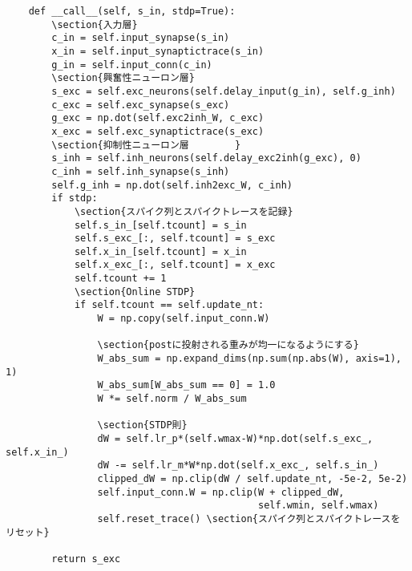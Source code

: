 \begin{verbatim}
    def __call__(self, s_in, stdp=True):
        \section{入力層}
        c_in = self.input_synapse(s_in)
        x_in = self.input_synaptictrace(s_in)
        g_in = self.input_conn(c_in)
        \section{興奮性ニューロン層}
        s_exc = self.exc_neurons(self.delay_input(g_in), self.g_inh)
        c_exc = self.exc_synapse(s_exc)
        g_exc = np.dot(self.exc2inh_W, c_exc)
        x_exc = self.exc_synaptictrace(s_exc)
        \section{抑制性ニューロン層        }
        s_inh = self.inh_neurons(self.delay_exc2inh(g_exc), 0)
        c_inh = self.inh_synapse(s_inh)
        self.g_inh = np.dot(self.inh2exc_W, c_inh)
        if stdp:
            \section{スパイク列とスパイクトレースを記録}
            self.s_in_[self.tcount] = s_in
            self.s_exc_[:, self.tcount] = s_exc
            self.x_in_[self.tcount] = x_in 
            self.x_exc_[:, self.tcount] = x_exc
            self.tcount += 1
            \section{Online STDP}
            if self.tcount == self.update_nt:
                W = np.copy(self.input_conn.W)
                
                \section{postに投射される重みが均一になるようにする}
                W_abs_sum = np.expand_dims(np.sum(np.abs(W), axis=1), 1)
                W_abs_sum[W_abs_sum == 0] = 1.0
                W *= self.norm / W_abs_sum
                
                \section{STDP則}
                dW = self.lr_p*(self.wmax-W)*np.dot(self.s_exc_, self.x_in_)
                dW -= self.lr_m*W*np.dot(self.x_exc_, self.s_in_)
                clipped_dW = np.clip(dW / self.update_nt, -5e-2, 5e-2)
                self.input_conn.W = np.clip(W + clipped_dW,
                                            self.wmin, self.wmax)
                self.reset_trace() \section{スパイク列とスパイクトレースをリセット}
        
        return s_exc
\end{verbatim}
